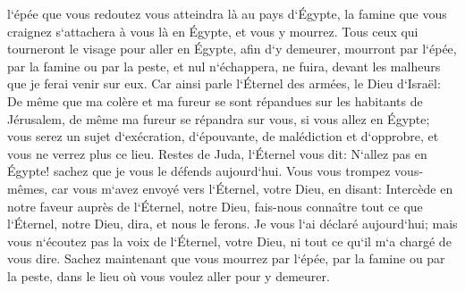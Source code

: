 \verse l`épée que vous redoutez vous atteindra là au pays d`Égypte, la famine que vous craignez s`attachera à vous là en Égypte, et vous y mourrez. 
\verse Tous ceux qui tourneront le visage pour aller en Égypte, afin d`y demeurer, mourront par l`épée, par la famine ou par la peste, et nul n`échappera, ne fuira, devant les malheurs que je ferai venir sur eux. 
\verse Car ainsi parle l`Éternel des armées, le Dieu d`Israël: De même que ma colère et ma fureur se sont répandues sur les habitants de Jérusalem, de même ma fureur se répandra sur vous, si vous allez en Égypte; vous serez un sujet d`exécration, d`épouvante, de malédiction et d`opprobre, et vous ne verrez plus ce lieu. 
\verse Restes de Juda, l`Éternel vous dit: N`allez pas en Égypte! sachez que je vous le défends aujourd`hui. 
\verse Vous vous trompez vous-mêmes, car vous m`avez envoyé vers l`Éternel, votre Dieu, en disant: Intercède en notre faveur auprès de l`Éternel, notre Dieu, fais-nous connaître tout ce que l`Éternel, notre Dieu, dira, et nous le ferons. 
\verse Je vous l`ai déclaré aujourd`hui; mais vous n`écoutez pas la voix de l`Éternel, votre Dieu, ni tout ce qu`il m`a chargé de vous dire. 
\verse Sachez maintenant que vous mourrez par l`épée, par la famine ou par la peste, dans le lieu où vous voulez aller pour y demeurer. 

